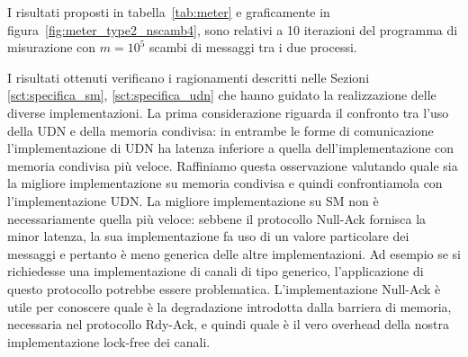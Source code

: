 I risultati proposti in tabella~\ref{tab:meter} e graficamente in figura~\ref{fig:meter_type2_nscamb4}, sono relativi a 10 iterazioni del programma di misurazione con $m = 10^5$ scambi di messaggi tra i due processi.

I risultati ottenuti verificano i ragionamenti descritti nelle Sezioni \ref{sct:specifica_sm}, \ref{sct:specifica_udn} che hanno guidato la realizzazione delle diverse implementazioni. La prima considerazione riguarda il confronto tra l'uso della UDN e della memoria condivisa: in entrambe le forme di comunicazione l'implementazione di UDN ha latenza inferiore a quella dell'implementazione con memoria condivisa pi\`u veloce. Raffiniamo questa osservazione valutando quale sia la migliore implementazione su memoria condivisa e quindi confrontiamola con l'implementazione UDN. La migliore implementazione su SM non \`e necessariamente quella pi\`u veloce: sebbene il protocollo Null-Ack fornisca la minor latenza, la sua implementazione fa uso di un valore particolare dei messaggi e pertanto \`e meno generica delle altre implementazioni. Ad esempio se si richiedesse una implementazione di canali di tipo generico, l'applicazione di questo protocollo potrebbe essere problematica. L'implementazione Null-Ack \`e utile per conoscere quale \`e la degradazione introdotta dalla barriera di memoria, necessaria nel protocollo Rdy-Ack, e quindi quale \`e il vero overhead della nostra implementazione lock-free dei canali. 

